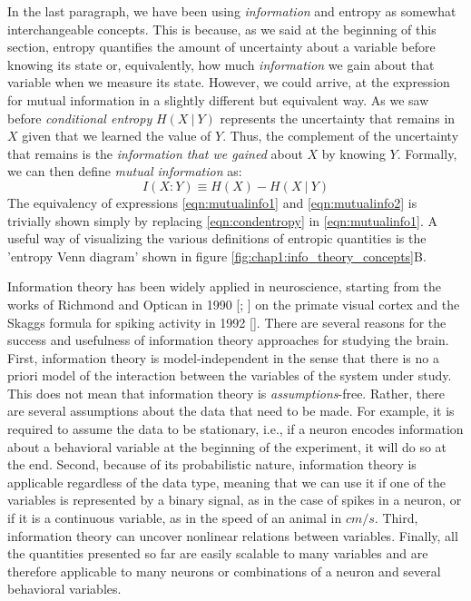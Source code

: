 In the last paragraph, we have been using \textit{information} and entropy as somewhat interchangeable concepts.
This is because, as we said at the beginning of this section, entropy quantifies the amount of uncertainty about a variable before knowing its state or, equivalently, how much \textit{information} we gain about that variable when we measure its state.
However, we could arrive, at the expression for mutual information in a slightly different but equivalent way.
As we saw before \textit{conditional entropy} $H(X\ |\ Y)$ represents the uncertainty that remains in $X$ given that we learned the value of $Y$.
Thus, the complement of the uncertainty that remains is the \textit{information that we gained} about $X$ by knowing $Y$. 
Formally, we can then define \textit{mutual information} as: 
\begin{equation}
\label{eqn:mutualinfo2}
    I(X:Y)\equiv H(X) - H(X\ |\ Y)
\end{equation}
The equivalency of expressions \ref{eqn:mutualinfo1} and \ref{eqn:mutualinfo2} is trivially shown simply by replacing \ref{eqn:condentropy} in \ref{eqn:mutualinfo1}.
A useful way of visualizing the various definitions of entropic quantities is the 'entropy Venn diagram' shown in figure \ref{fig:chap1:info_theory_concepts}B. 

Information theory has been widely applied in neuroscience, starting from the works of Richmond and Optican in 1990 [\cite{richmond1990temporalI}; \cite{richmond1990temporalII}] on the primate visual cortex and the Skaggs formula for spiking activity in 1992 [\cite{skaggs1992information}].
There are several reasons for the success and usefulness of information theory approaches for studying the brain.
First, information theory is model-independent in the sense that there is no a priori model of the interaction between the variables of the system under study.
This does not mean that information theory is \textit{assumptions}-free. 
Rather, there are several assumptions about the data that need to be made. 
For example, it is required to assume the data to be stationary, i.e., if a neuron encodes information about a behavioral variable at the beginning of the experiment, it will do so at the end.     
Second, because of its probabilistic nature, information theory is applicable regardless of the data type, meaning that we can use it if one of the variables is represented by a binary signal, as in the case of spikes in a neuron, or if it is a continuous variable, as in the speed of an animal in $cm/s$.
Third, information theory can uncover nonlinear relations between variables.
Finally, all the quantities presented so far are easily scalable to many variables and are therefore applicable to many neurons or combinations of a neuron and several behavioral variables.

